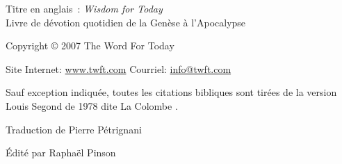 \newpage
\mbox{}
\vfill
\noindent Titre en anglais~: \emph{Wisdom for Today}\\
Livre de dévotion quotidien de la Genèse à l'Apocalypse

\noindent Copyright \copyright{} 2007 The Word For Today

\noindent Site Internet: \url{www.twft.com}
\noindent Courriel: \url{info@twft.com}

\noindent Sauf exception indiquée, toutes les citations bibliques sont tirées de
 la version Louis Segond de 1978 dite \og La Colombe \fg{}.


\noindent Traduction de Pierre Pétrignani

\noindent Édité par Raphaël Pinson


